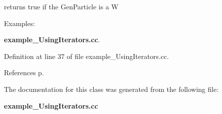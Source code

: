 returns true if the Gen\-Particle is a W 

\begin{Desc}
\item[Examples: ]\par
{\bf example\_\-Using\-Iterators.cc}.\end{Desc}


Definition at line 37 of file example\_\-Using\-Iterators.cc.

References p.

The documentation for this class was generated from the following file:\begin{CompactItemize}
\item 
{\bf example\_\-Using\-Iterators.cc}\end{CompactItemize}
